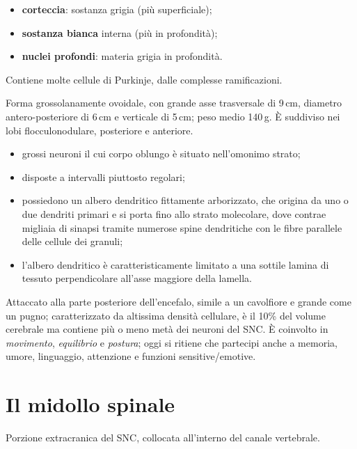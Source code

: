 \begin{itemize}
  \item \textbf{corteccia}: sostanza grigia (più superficiale);
  \item \textbf{sostanza bianca} interna (più in profondità);
  \item \textbf{nuclei profondi}: materia grigia in profondità.
\end{itemize}

Contiene molte cellule di Purkinje, dalle complesse ramificazioni.

Forma grossolanamente ovoidale, con grande asse trasversale di 9\,cm,
diametro antero-posteriore di 6\,cm e verticale di 5\,cm; peso medio 140\,g.
È suddiviso nei lobi flocculonodulare, posteriore e anteriore.

\begin{itemize}
  \item grossi neuroni il cui corpo oblungo è situato nell'omonimo strato;
  \item disposte a intervalli piuttosto regolari;
  \item possiedono un albero dendritico fittamente arborizzato, che origina
    da uno o due dendriti primari e si porta fino allo strato molecolare,
    dove contrae migliaia di sinapsi tramite numerose spine dendritiche con
    le fibre parallele delle cellule dei granuli;
  \item l'albero dendritico è caratteristicamente limitato a una sottile
    lamina di tessuto perpendicolare all'asse maggiore della lamella.
\end{itemize}

Attaccato alla parte posteriore dell'encefalo, simile a un cavolfiore e
grande come un pugno; caratterizzato da altissima densità cellulare, è il
10\% del volume cerebrale ma contiene più o meno metà dei neuroni del SNC.
È coinvolto in \textit{movimento}, \textit{equilibrio} e \textit{postura};
oggi si ritiene che partecipi anche a memoria, umore, linguaggio, attenzione
e funzioni sensitive/emotive.

\section{Il midollo spinale}

Porzione extracranica del SNC, collocata all'interno del canale vertebrale.

